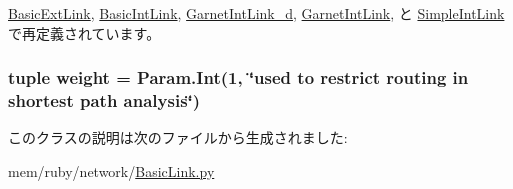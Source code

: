 \hyperlink{classBasicLink_1_1BasicExtLink_acce15679d830831b0bbe8ebc2a60b2ca}{BasicExtLink}, \hyperlink{classBasicLink_1_1BasicIntLink_acce15679d830831b0bbe8ebc2a60b2ca}{BasicIntLink}, \hyperlink{classGarnetLink__d_1_1GarnetIntLink__d_acce15679d830831b0bbe8ebc2a60b2ca}{GarnetIntLink\_\-d}, \hyperlink{classGarnetLink_1_1GarnetIntLink_acce15679d830831b0bbe8ebc2a60b2ca}{GarnetIntLink}, と \hyperlink{classSimpleLink_1_1SimpleIntLink_acce15679d830831b0bbe8ebc2a60b2ca}{SimpleIntLink}で再定義されています。\hypertarget{classBasicLink_1_1BasicLink_a90d9613549ac0a6a4fe0bc646fc0892f}{
\subsubsection[{weight}]{\setlength{\rightskip}{0pt plus 5cm}tuple {\bf weight} = Param.Int(1, \char`\"{}used to restrict routing in shortest path analysis\char`\"{})}}
\label{classBasicLink_1_1BasicLink_a90d9613549ac0a6a4fe0bc646fc0892f}


このクラスの説明は次のファイルから生成されました:\begin{DoxyCompactItemize}
\item 
mem/ruby/network/\hyperlink{BasicLink_8py}{BasicLink.py}\end{DoxyCompactItemize}
